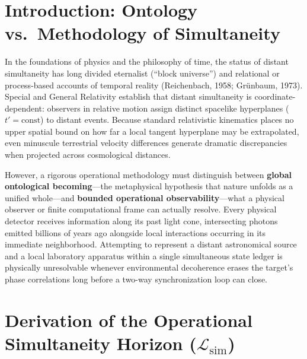 \documentclass[11pt,a4paper]{article}
\begin{document}
\vspace{0.5em}
\noindent{}

\section{Introduction: Ontology vs.\ Methodology of Simultaneity}

In the foundations of physics and the philosophy of time, the status of distant simultaneity has long divided eternalist (``block universe'') and relational or process-based accounts of temporal reality (Reichenbach, 1958; Gr\"unbaum, 1973). Special and General Relativity establish that distant simultaneity is coordinate-dependent: observers in relative motion assign distinct spacelike hyperplanes ($t' = \mathrm{const}$) to distant events. Because standard relativistic kinematics places no upper spatial bound on how far a local tangent hyperplane may be extrapolated, even minuscule terrestrial velocity differences generate dramatic discrepancies when projected across cosmological distances.

However, a rigorous operational methodology must distinguish between \textbf{global ontological becoming}---the metaphysical hypothesis that nature unfolds as a unified whole---and \textbf{bounded operational observability}---what a physical observer or finite computational frame can actually resolve. Every physical detector receives information along its past light cone, intersecting photons emitted billions of years ago alongside local interactions occurring in its immediate neighborhood. Attempting to represent a distant astronomical source and a local laboratory apparatus within a single simultaneous state ledger is physically unresolvable whenever environmental decoherence erases the target's phase correlations long before a two-way synchronization loop can close.

\section{Derivation of the Operational Simultaneity Horizon ($\mathcal{L}_{\mathrm{sim}}$)}
\end{document}
